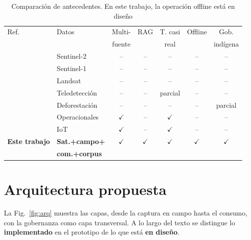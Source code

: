 \documentclass[conference]{IEEEtran}
\newcommand{\sicheck}{\ensuremath{\checkmark}}
\newcommand{\nocheck}{--}
\begin{document}
\begin{table}[!t]
\caption{Comparación de antecedentes. En este trabajo, la operación offline está en diseño}
\label{tab:comp}
\centering
\footnotesize
\setlength{\tabcolsep}{3pt}
\begin{tabular}{@{}l l c c c c c@{}}
\toprule
Ref. & Datos & Multi- & RAG & T. casi & Offline & Gob. \\
 & & fuente & & real & & indígena \\
\midrule
\cite{camalan2022} & Sentinel-2 & \nocheck & \nocheck & \nocheck & \nocheck & \nocheck \\
\cite{pereira2024} & Sentinel-1 & \nocheck & \nocheck & \nocheck & \nocheck & \nocheck \\
\cite{caballero2018} & Landsat & \nocheck & \nocheck & \nocheck & \nocheck & \nocheck \\
\cite{valbuena2024} & Teledetección & \nocheck & \nocheck & parcial & \nocheck & \nocheck \\
\cite{siqueira2021} & Deforestación & \nocheck & \nocheck & \nocheck & \nocheck & parcial \\
\cite{vishwakarma2025} & Operacionales & \sicheck & \nocheck & \sicheck & \nocheck & \nocheck \\
\cite{le2024} & IoT & \sicheck & \nocheck & \sicheck & \nocheck & \nocheck \\
\midrule
\textbf{Este trabajo} & \textbf{Sat.+campo+} & \sicheck & \sicheck & \sicheck & \sicheck & \sicheck \\
 & \textbf{com.+corpus} & & & & & \\
\bottomrule
\end{tabular}
\end{table}

\section{Arquitectura propuesta}\label{sec:arq}

La Fig.~\ref{fig:arq} muestra las capas, desde la captura en campo hasta el consumo, con la gobernanza como capa transversal. A lo largo del texto se distingue lo \textbf{implementado} en el prototipo de lo que está \textbf{en diseño}.
\end{document}
